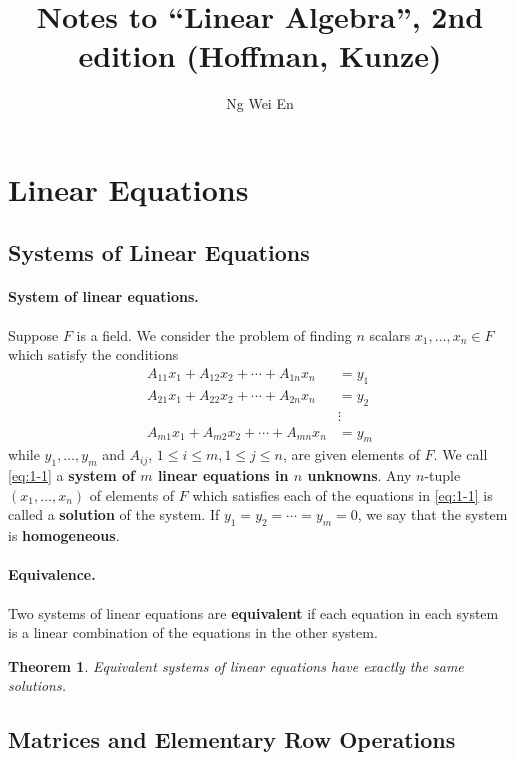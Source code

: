 \documentclass{article}
\title{Notes to ``Linear Algebra'', 2nd edition (Hoffman, Kunze)}
\author{Ng Wei En}
\newtheorem{theorem}{Theorem}[section]
\begin{document}
\maketitle
\tableofcontents
\newpage

\section{Linear Equations}

\setcounter{subsection}{1}
\subsection{Systems of Linear Equations}

\paragraph{System of linear equations.} Suppose $F$ is a field. We consider the
problem of finding $n$ scalars $x_1, \ldots, x_n \in F$ which satisfy the
conditions
\begin{align*}\label{eq:1-1}\tag{1-1}
  A_{11}x_1 + A_{12}x_2 + \cdots + A_{1n}x_n &= y_1 \\
  A_{21}x_1 + A_{22}x_2 + \cdots + A_{2n}x_n &= y_2 \\
  &\vdots \\
  A_{m1}x_1 + A_{m2}x_2 + \cdots + A_{mn}x_n &= y_m
\end{align*}
while $y_1, \ldots, y_m$ and $A_{ij}$, $1 \leq i \leq m, 1 \leq j \leq n$, are
given elements of $F$. We call \eqref{eq:1-1} a \textbf{system of $m$ linear
equations in $n$ unknowns}. Any $n$-tuple $(x_1, \ldots, x_n)$ of elements of
$F$ which satisfies each of the equations in \eqref{eq:1-1} is called a
\textbf{solution} of the system. If $y_1 = y_2 = \cdots = y_m = 0$, we say that
the system is \textbf{homogeneous}.

\paragraph{Equivalence.} Two systems of linear equations are \textbf{equivalent}
if each equation in each system is a linear combination of the equations in the
other system.

\begin{theorem}
  Equivalent systems of linear equations have exactly the same solutions.
\end{theorem}

\subsection{Matrices and Elementary Row Operations}
\end{document}
